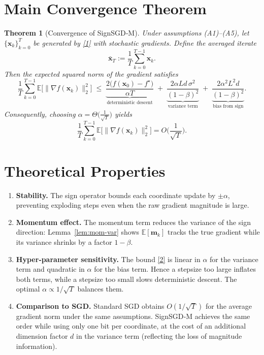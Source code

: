 \documentclass{article}
\newtheorem{theorem}{Theorem}
\newcommand{\E}{\mathbb{E}}
\begin{document}
\section*{Main Convergence Theorem}
\begin{theorem}[Convergence of SignSGD‑M]\label{thm:main}
Under assumptions (A1)–(A5), let $\{\bm{x}_{k}\}_{k=0}^{T}$ be generated by \eqref{1} with stochastic gradients. Define the averaged iterate
\[
\bar{\bm{x}}_{T}:=\frac{1}{T}\sum_{k=0}^{T-1}\bm{x}_{k}.
\]
Then the expected squared norm of the gradient satisfies
\[
\frac{1}{T}\sum_{k=0}^{T-1}\E\!\big[\|\nabla f(\bm{x}_{k})\|_{2}^{2}\big]
\;\le\;
\underbrace{\frac{2\big(f(\bm{x}_{0})-f^{\star}\big)}{\alpha T}}_{\text{deterministic descent}}
\;+\;
\underbrace{\frac{2\alpha L d\,\sigma^{2}}{(1-\beta)^{2}}}_{\text{variance term}}
\;+\;
\underbrace{\frac{2\alpha^{2}L^{2}d}{(1-\beta)^{2}}}_{\text{bias from sign}} .
\tag{2}
\]
Consequently, choosing $\alpha = \Theta\!\big(\frac{1}{\sqrt{T}}\big)$ yields
\[
\frac{1}{T}\sum_{k=0}^{T-1}\E\!\big[\|\nabla f(\bm{x}_{k})\|_{2}^{2}\big]=O\!\Big(\frac{1}{\sqrt{T}}\Big).
\]
\end{theorem}

\section*{Theoretical Properties}
\begin{enumerate}
\item \textbf{Stability.} The sign operator bounds each coordinate update by $\pm\alpha$, preventing exploding steps even when the raw gradient magnitude is large.
\item \textbf{Momentum effect.} The momentum term reduces the variance of the sign direction: Lemma~\ref{lem:mom-var} shows $\E[\bm{m}_{k}]$ tracks the true gradient while its variance shrinks by a factor $1-\beta$.
\item \textbf{Hyper‑parameter sensitivity.} The bound \eqref{2} is linear in $\alpha$ for the variance term and quadratic in $\alpha$ for the bias term. Hence a stepsize too large inflates both terms, while a stepsize too small slows deterministic descent. The optimal $\alpha\propto 1/\sqrt{T}$ balances them.
\item \textbf{Comparison to SGD.} Standard SGD obtains $O(1/\sqrt{T})$ for the average gradient norm under the same assumptions. SignSGD‑M achieves the same order while using only one bit per coordinate, at the cost of an additional dimension factor $d$ in the variance term (reflecting the loss of magnitude information).
\end{enumerate}
\end{document}
